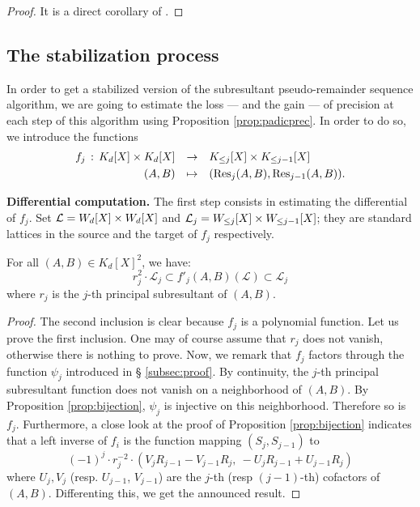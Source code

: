 \documentclass{article}
\begin{document}
\begin{proof}
It is a direct corollary of \cite[Proposition 3.12]{padicprec}.
\end{proof}

\subsection{The stabilization process}

In order to get a stabilized version of the subresultant 
pseudo-remainder sequence algorithm, we are going to estimate 
the loss --- and the gain --- of precision at each step of this 
algorithm using Proposition \ref{prop:padicprec}. In order to do
so, we introduce the functions
$$\begin{array}{rcl}
f_j \, : \, K_d[X] \times K_d[X] & \to & K_{\leq j}[X] \times 
K_{\leq j-1}[X] \smallskip \\
(A,B) & \mapsto & (\Res_j(A,B), \Res_{j-1}(A,B)).
\end{array}$$

\noindent
{\bf Differential computation.}
The first step consists in estimating the differential of $f_j$. 
Set $\mathcal L = W_d[X] \times W_d[X]$ and $\mathcal L_j = 
W_{\leq j}[X] \times W_{\leq j-1}[X]$; they are standard lattices
in the source and the target of $f_j$ respectively.

\begin{lem}
\label{lem:diff}
For all $(A,B) \in K_d[X]^2$, we have:
$$r_j^2 \cdot \mathcal L_j 
\subset f'_j(A,B)(\mathcal L) \subset \mathcal L_j$$
where $r_j$ is the $j$-th principal subresultant of $(A,B)$.
\end{lem}

\begin{proof}
The second inclusion is clear because $f_j$ is a polynomial function. 
Let us prove the first inclusion. One may of course assume that $r_j$ 
does not vanish, otherwise there is nothing to prove. Now, we remark 
that $f_j$ factors through the function $\psi_j$ introduced in \S 
\ref{subsec:proof}. By continuity, the $j$-th principal subresultant 
function does not vanish on a neighborhood of $(A,B)$. By Proposition 
\ref{prop:bijection}, $\psi_j$ is injective on this neighborhood. 
Therefore so is $f_j$. Furthermore, a close look at the proof of 
Proposition \ref{prop:bijection} indicates that a left inverse of $f_i$ 
is the function mapping $(S_j, S_{j-1})$ to
$$(-1)^j \cdot r_j^{-2} \cdot 
(V_j R_{j-1}{-}V_{j-1} R_j,\: -U_j R_{j-1}{+}U_{j-1} R_j)$$
where $U_j, V_j$ (resp. $U_{j-1}$, $V_{j-1}$) are the $j$-th (resp 
$(j-1)$-th) cofactors of $(A,B)$. Differenting this, we get the
announced result.
\end{proof}
\end{document}
